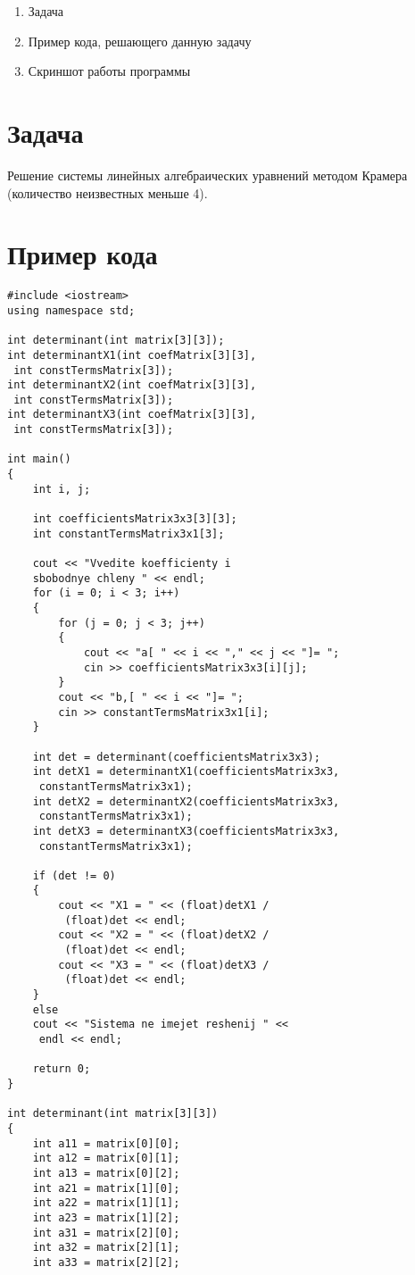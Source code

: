 \documentclass[12pt,a4paper]{scrartcl}
\begin{document}
\begin{enumerate}
	\item Задача
	\item Пример кода, решающего данную задачу
	\item Скриншот работы программы
\end{enumerate}
\section{Задача}
Решение системы линейных алгебраических уравнений методом Крамера (количество неизвестных меньше 4).
\section{Пример кода}
\label{sec:exp:code}
\begin{verbatim}
#include <iostream>
using namespace std;

int determinant(int matrix[3][3]);
int determinantX1(int coefMatrix[3][3],
 int constTermsMatrix[3]);
int determinantX2(int coefMatrix[3][3],
 int constTermsMatrix[3]);
int determinantX3(int coefMatrix[3][3],
 int constTermsMatrix[3]);

int main()
{
	int i, j;
	
	int coefficientsMatrix3x3[3][3];
	int constantTermsMatrix3x1[3];
	
	cout << "Vvedite koefficienty i 
	sbobodnye chleny " << endl;
	for (i = 0; i < 3; i++)
	{
		for (j = 0; j < 3; j++)
		{
			cout << "a[ " << i << "," << j << "]= ";
			cin >> coefficientsMatrix3x3[i][j];
		}
		cout << "b,[ " << i << "]= ";
		cin >> constantTermsMatrix3x1[i];
	}
	
	int det = determinant(coefficientsMatrix3x3);
	int detX1 = determinantX1(coefficientsMatrix3x3,
	 constantTermsMatrix3x1);
	int detX2 = determinantX2(coefficientsMatrix3x3,
	 constantTermsMatrix3x1);
	int detX3 = determinantX3(coefficientsMatrix3x3,
	 constantTermsMatrix3x1);
	
	if (det != 0)
	{
		cout << "X1 = " << (float)detX1 /
		 (float)det << endl;
		cout << "X2 = " << (float)detX2 /
		 (float)det << endl;
		cout << "X3 = " << (float)detX3 /
		 (float)det << endl;
	}
	else
	cout << "Sistema ne imejet reshenij " <<
	 endl << endl;
	
	return 0;
}

int determinant(int matrix[3][3])
{
	int a11 = matrix[0][0];
	int a12 = matrix[0][1];
	int a13 = matrix[0][2];
	int a21 = matrix[1][0];
	int a22 = matrix[1][1];
	int a23 = matrix[1][2];
	int a31 = matrix[2][0];
	int a32 = matrix[2][1];
	int a33 = matrix[2][2];
	

\end{verbatim}
\end{document}
